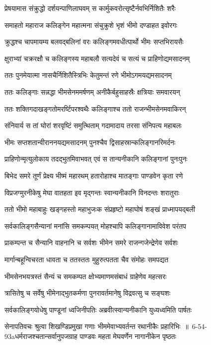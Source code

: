 \twolineshloka
{प्रेषयामास संक्रुद्धो दर्शयन्पाणिलाघवम्}
{स कार्मुकवरोत्सृष्टैर्नवभिर्निशितैः शरैः}


\twolineshloka
{समाहतो महाराज कलिङ्गेन महात्मना}
{संचुक्रुशे भृशं भीमो दण्डाहत इवोरगः}


\twolineshloka
{क्रुद्धश्च चापमायम्य बलवद्बलिनां वरः}
{कलिङ्गमवधीत्पार्थो भीमः सप्तभिरायसैः}


\twolineshloka
{क्षुराभ्यां चक्ररक्षौ च कलिङ्गस्य महाबलौ}
{सत्यदेवं च सत्यं च प्राहिणोद्यमसादनम्}


\twolineshloka
{ततः पुनमेयात्मा नासचैर्निशितैस्त्रिभिः}
{केतुमन्तं रणे भीमोऽगमयद्यमसादनम्}


\twolineshloka
{ततः कलिङ्गाः सन्नद्धा भीमसेनममर्षणम्}
{अनीकैर्बहुसाहस्रैः क्षत्रियाः समवारयन्}


\twolineshloka
{ततः शक्तिगदाखङ्गतोमरर्ष्टिपरश्वथैः}
{कलिङ्गाश्च ततो राजन्भीमसेनमवाकिरन्}


\twolineshloka
{संनिवार्य स तां घोरां शरवृष्टिं समुत्थिताम्}
{गदामादाय तरसा संनिपत्य महाबलः}


\twolineshloka
{भीमः सप्तशतान्वीराननयद्यमसादनम्}
{पुनश्चैव द्विसाहस्रान्कलिङ्गानरिमर्दनः}


\twolineshloka
{प्राहिणोन्मृत्युलोकाय तदद्भुतमिवाभवत्}
{एवं स तान्यनीकानि कलिङ्गानां पुनःपुनः}


\twolineshloka
{बिभेद समरे तूर्णं प्रेक्ष्य भीष्मं महारथम्}
{हतारोहाश्च मातङ्गाः पाण्डवेन कृता रणे}


\twolineshloka
{विप्रजग्मुरनीकेषु मेघा वातहता इव}
{मृद्गन्तः स्वान्यनीकानि विनदन्तः शरातुराः}


\twolineshloka
{ततो भीमो महाबाहुः खङ्गहस्तो महाभुजःक}
{संप्रहृष्टो महाघोषं शङ्खं प्राध्मापयद्बली}


\twolineshloka
{सर्वकालिङ्गसैन्यानां मनांसि समकम्पयत्}
{मोहश्चापि कलिङ्गानामाविवेश परंतप}


\twolineshloka
{प्राकम्पन्त च सैन्यानि वाहनानि च सर्वशः}
{भीमेन समरे राजन्गजेन्द्रेणेव सर्वशः}


\twolineshloka
{मार्गान्बहून्विचरता धावता च ततस्ततः}
{मुहुरुत्पतता चैव संमोहः समपद्यत}


\twolineshloka
{भीमसेनभयत्रस्तं सैन्यं च समकम्पत}
{क्षोभ्यमाणमसंबाधं ग्राहेणेव महत्सरः}


\twolineshloka
{त्रासितेषु च सर्वेषु भीमेनाद्भुतकर्मणा}
{पुनरावर्तमानेषु विद्रवत्सु च सङ्घशः}


\twolineshloka
{सर्वकालिङ्गयोधेषु पाण्डूनां ध्वजिनीपतिः}
{अब्रवीत्स्वान्यनीकानि युध्यध्वमिति पार्षतः}


\threelineshloka
{सेनापतिवचः श्रुत्वा शिखण्डिप्रमुखा गणाः}
{भीममेवाभ्यवर्तन्त रथानीकैः प्रहारिभिः ॥ 6-54-93aधर्मराजश्चतान्सर्वानुपजग्राह पाण्डवः}
{महता मेघवर्णेन नागानीकेन पृष्ठतः}


